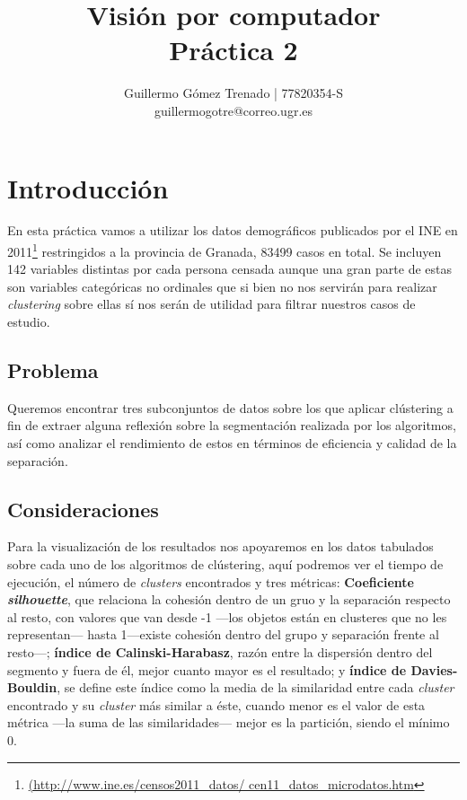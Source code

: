 \documentclass{article}
\title{Visión por computador\\
Práctica 2}
\author{Guillermo G\'omez Trenado | 77820354-S \\
guillermogotre@correo.ugr.es}
\begin{document}

\maketitle

\tableofcontents

\newpage

\section{Introducción}

En esta práctica vamos a utilizar los datos demográficos publicados por el INE en 2011\footnote{\url{(http://www.ine.es/censos2011_datos/
cen11_datos_microdatos.htm}} restringidos a la provincia de Granada, 83499 casos en total. Se incluyen 142 variables distintas por cada persona censada aunque una gran parte de estas son variables categóricas no ordinales que si bien no nos servirán para realizar \textit{clustering} sobre ellas sí nos serán de utilidad para filtrar nuestros casos de estudio.

\subsection{Problema}

Queremos encontrar tres subconjuntos de datos sobre los que aplicar clústering a fin de extraer alguna reflexión sobre la segmentación realizada por los algoritmos, así como analizar el rendimiento de estos en términos de eficiencia y calidad de la separación.

\subsection{Consideraciones}

Para la visualización de los resultados nos apoyaremos en los datos tabulados sobre cada uno de los algoritmos de clústering, aquí podremos ver el tiempo de ejecución, el número de \textit{clusters} encontrados y tres métricas: \textbf{Coeficiente \textit{silhouette}}, que relaciona la cohesión dentro de un gruo y la separación respecto al resto, con valores que van desde -1 ---los objetos están en clusteres que no les representan--- hasta 1---existe cohesión dentro del grupo y separación frente al resto---; \textbf{índice de Calinski-Harabasz}, razón entre la dispersión dentro del segmento y fuera de él, mejor cuanto mayor es el resultado; y \textbf{índice de Davies-Bouldin}, se define este índice como la media de la similaridad entre cada \textit{cluster} encontrado y su \textit{cluster} más similar a éste, cuando menor es el valor de esta métrica ---la suma de las similaridades--- mejor es la partición, siendo el mínimo 0.
\end{document}
